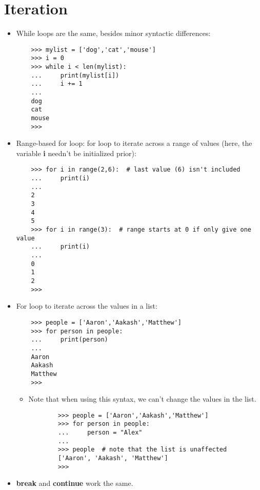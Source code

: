 \documentclass{article}
\begin{document}
\section{Iteration}
\begin{itemize}
    \item While loops are the same, besides minor syntactic differences:
    \begin{lstlisting}
    >>> mylist = ['dog','cat','mouse']
    >>> i = 0
    >>> while i < len(mylist):
    ...     print(mylist[i])
    ...     i += 1
    ... 
    dog
    cat
    mouse
    >>> 
    \end{lstlisting}
    \item Range-based for loop: for loop to iterate across a range of values (here, the variable \textbf{i} needn't be initialized prior):
    \begin{lstlisting}
    >>> for i in range(2,6):  # last value (6) isn't included
    ...     print(i)
    ... 
    2
    3
    4
    5
    >>> for i in range(3):  # range starts at 0 if only give one value
    ...     print(i)
    ... 
    0
    1
    2
    >>> 
    \end{lstlisting}
    \item For loop to iterate across the values in a list:
    \begin{lstlisting}
    >>> people = ['Aaron','Aakash','Matthew']
    >>> for person in people:
    ...     print(person)
    ... 
    Aaron
    Aakash
    Matthew
    >>>
    \end{lstlisting}
    \begin{itemize}
        \item Note that when using this syntax, we can't change the values in the list.
        \begin{lstlisting}
        >>> people = ['Aaron','Aakash','Matthew']
        >>> for person in people:
        ...     person = "Alex"
        ... 
        >>> people  # note that the list is unaffected
        ['Aaron', 'Aakash', 'Matthew']
        >>> 
        \end{lstlisting}
    \end{itemize}
    \item \textbf{break} and \textbf{continue} work the same.
\end{itemize}
\end{document}
